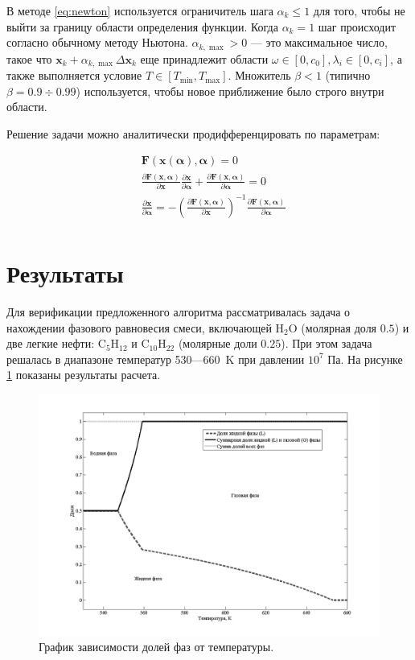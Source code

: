 \documentclass[12pt]{article}
\newcommand{\pd}[2]{\frac{\partial #1}{\partial #2}}
\let\dividesymbol\div
\renewcommand{\div}{\operatorname{div}}
\renewcommand{\leq}{\leqslant}
\begin{document}
В методе \eqref{eq:newton} используется ограничитель шага $\alpha_k \leq 1$ для того, чтобы не выйти за границу области определения функции. Когда $\alpha_k = 1$ шаг происходит согласно обычному методу Ньютона. $\alpha_{k, \max} > 0$ --- это максимальное число, такое что $\mathbf{x}_k + \alpha_{k,\max} \Delta \mathbf{x}_{k}$ еще принадлежит области $\omega \in [0,c_0], \lambda_i \in [0, c_i]$, а также выполняется условие $T \in [T_{\min}, T_{\max}]$. Множитель $\beta < 1$ (типично $\beta = 0.9 \dividesymbol 0.99$) используется, чтобы новое приближение было строго внутри области.

Решение задачи можно аналитически продифференцировать по параметрам:

\begin{equation}
\begin{aligned}
&\mathbf{F}(\mathbf{x}(\boldsymbol \alpha), \boldsymbol \alpha) = 0\\
&\pd{\mathbf{F}(\mathbf{x}, \boldsymbol \alpha)}{\mathbf{x}} \pd{\mathbf{x}}{\boldsymbol \alpha} + \pd{\mathbf{F}(\mathbf{x}, \boldsymbol \alpha)}{\boldsymbol \alpha} = 0\\
&\pd{\mathbf{x}}{\boldsymbol \alpha} = -\left(\pd{\mathbf{F}(\mathbf{x}, \boldsymbol \alpha)}{\mathbf{x}}\right)^{-1} \pd{\mathbf{F}(\mathbf{x}, \boldsymbol \alpha)}{\boldsymbol \alpha} \\
\end{aligned}
\end{equation}

\section{Результаты}
Для верификации предложенного алгоритма рассматривалась задача о нахождении фазового равновесия смеси, включающей $\mathrm{H_2O}$ (молярная доля $0.5$) и две легкие нефти: $\mathrm{C_5H_{12}}$ и $\mathrm{C_{10}H_{22}}$ (молярные доли $0.25$). При этом задача решалась в диапазоне температур 530---660~K при давлении $10^7$ Па. На рисунке \ref{fig:1} показаны результаты расчета. 

\begin{figure}
	\centering
	\includegraphics[width=\textwidth]{Figure1.png}
	\caption{График зависимости долей фаз от температуры.}
	\label{fig:1}
\end{figure}
\end{document}
